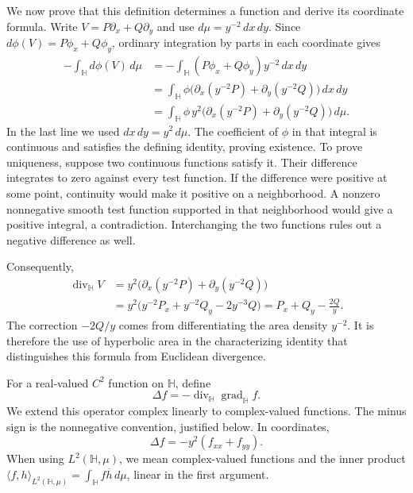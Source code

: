 We now prove that this definition determines a function and derive its coordinate formula. Write $V=P\partial_x+Q\partial_y$ and use $d\mu=y^{-2}\,dx\,dy$. Since $d\phi(V)=P\phi_x+Q\phi_y$, ordinary integration by parts in each coordinate gives
\[
 \begin{aligned}
 -\int_{\mathbb H}d\phi(V)\,d\mu
 &=-\int_{\mathbb H}(P\phi_x+Q\phi_y)y^{-2}\,dx\,dy\\
 &=\int_{\mathbb H}\phi\bigl(\partial_x(y^{-2}P)+\partial_y(y^{-2}Q)\bigr)\,dx\,dy\\
 &=\int_{\mathbb H}\phi\,y^2
   \bigl(\partial_x(y^{-2}P)+\partial_y(y^{-2}Q)\bigr)\,d\mu.
 \end{aligned}
\]
In the last line we used $dx\,dy=y^2\,d\mu$. The coefficient of $\phi$ in that integral is continuous and satisfies the defining identity, proving existence. To prove uniqueness, suppose two continuous functions satisfy it. Their difference integrates to zero against every test function. If the difference were positive at some point, continuity would make it positive on a neighborhood. A nonzero nonnegative smooth test function supported in that neighborhood would give a positive integral, a contradiction. Interchanging the two functions rules out a negative difference as well.

Consequently,
\begin{equation}\label{eq:divergence-coordinates}
 \begin{aligned}
 \operatorname{div}_{\mathbb H}V
 &=y^2\bigl(\partial_x(y^{-2}P)+\partial_y(y^{-2}Q)\bigr)\\
 &=y^2\bigl(y^{-2}P_x+y^{-2}Q_y-2y^{-3}Q\bigr)
 =P_x+Q_y-\frac{2Q}{y}.
 \end{aligned}
\end{equation}
The correction $-2Q/y$ comes from differentiating the area density $y^{-2}$. It is therefore the use of hyperbolic area in the characterizing identity that distinguishes this formula from Euclidean divergence.

\begin{definition}\label{hyperbolic.laplacian}
For a real-valued $C^2$ function on $\mathbb H$, define
\[
 \Delta f=-\operatorname{div}_{\mathbb H}\operatorname{grad}_{\mathbb H}f.
\]
We extend this operator complex linearly to complex-valued functions. The minus sign is the nonnegative convention, justified below. In coordinates,
\[
 \Delta f=-y^2(f_{xx}+f_{yy}).
\]
When using $L^2(\mathbb H,\mu)$, we mean complex-valued functions and the inner product
$\langle f,h\rangle_{L^2(\mathbb H,\mu)}=\int_{\mathbb H}f\overline h\,d\mu$, linear in the first argument.
\end{definition}

